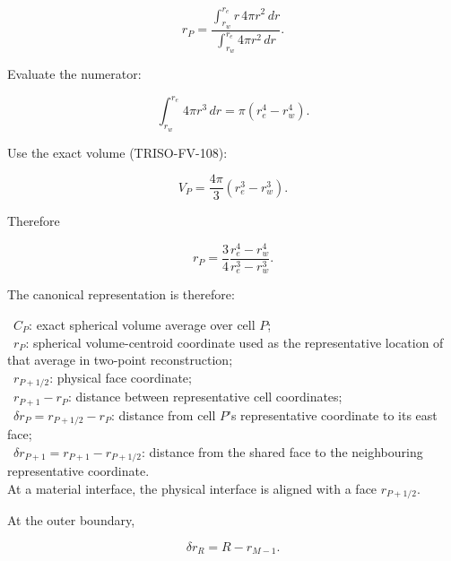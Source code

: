 \documentclass[11pt,a4paper]{article}
\begin{document}
\begin{equation}
\boxed{
r_P
=
\frac{
\displaystyle
\int_{r_w}^{r_e}
r\,4\pi r^2\,dr
}{
\displaystyle
\int_{r_w}^{r_e}
4\pi r^2\,dr
}.
}
\tag{TRISO-FV-109A}
\label{eq:triso-fv-109a}
\end{equation}

Evaluate the numerator:

\begin{equation}
\int_{r_w}^{r_e}
4\pi r^3\,dr
=
\pi
\left(
r_e^4-r_w^4
\right).
\tag{TRISO-FV-109B}
\label{eq:triso-fv-109b}
\end{equation}

Use the exact volume (TRISO-FV-108):

\begin{equation}
V_P
=
\frac{4\pi}{3}
\left(
r_e^3-r_w^3
\right).
\tag{TRISO-FV-109C}
\label{eq:triso-fv-109c}
\end{equation}

Therefore

\begin{equation}
\boxed{
r_P
=
\frac34
\frac{
r_e^4-r_w^4
}{
r_e^3-r_w^3
}.
}
\tag{TRISO-FV-109D}
\label{eq:triso-fv-109d}
\end{equation}

The canonical representation is therefore:

\noindent\textbullet\ $C_P$: exact spherical volume average over cell $P$;\\
\noindent\textbullet\ $r_P$: spherical volume-centroid coordinate used as the representative location of that average in two-point reconstruction;\\
\noindent\textbullet\ $r_{P+1/2}$: physical face coordinate;\\
\noindent\textbullet\ $r_{P+1}-r_P$: distance between representative cell coordinates;\\
\noindent\textbullet\ $\delta r_P=r_{P+1/2}-r_P$: distance from cell $P$'s representative coordinate to its east face;\\
\noindent\textbullet\ $\delta r_{P+1}=r_{P+1}-r_{P+1/2}$: distance from the shared face to the neighbouring representative coordinate.\\

At a material interface, the physical interface is aligned with a face $r_{P+1/2}$.

At the outer boundary,

\begin{equation}
\delta r_R=R-r_{M-1}.
\tag{TRISO-FV-109E}
\label{eq:triso-fv-109e}
\end{equation}
\end{document}
